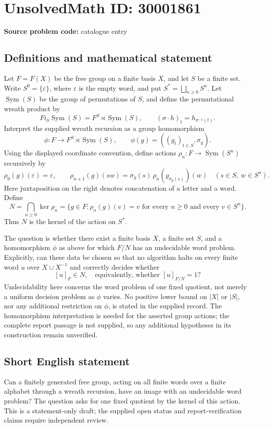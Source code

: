 \documentclass[11pt]{article}
\begin{document}
\section*{UnsolvedMath ID: 30001861}
\textbf{Source problem code:} catalogue entry
\subsection{Definitions and mathematical statement}
Let \(F=F(X)\) be the free group on a finite basis \(X\), and let \(S\) be a finite set. Write \(S^0=\{\varepsilon\}\), where \(\varepsilon\) is the empty word, and put \(S^*=\bigsqcup_{n\geq 0}S^n\). Let \(\operatorname{Sym}(S)\) be the group of permutations of \(S\), and define the permutational wreath product by
\[
F\wr_S\operatorname{Sym}(S)=F^S\rtimes\operatorname{Sym}(S),
\qquad (\sigma\cdot h)_t=h_{\sigma^{-1}(t)}.
\]
Interpret the supplied wreath recursion as a group homomorphism
\[
\phi:F\longrightarrow F^S\rtimes\operatorname{Sym}(S),
\qquad \phi(g)=((g_t)_{t\in S},\sigma_g).
\]
Using the displayed coordinate convention, define actions \(\rho_n:F\to\operatorname{Sym}(S^n)\) recursively by
\[
\rho_0(g)(\varepsilon)=\varepsilon,
\qquad
\rho_{n+1}(g)(sw)=\sigma_g(s)\,\rho_n(g_{\sigma_g(s)})(w)
\quad(s\in S,\ w\in S^n).
\]
Here juxtaposition on the right denotes concatenation of a letter and a word. Define
\[
N=\bigcap_{n\geq0}\ker\rho_n
 =\{g\in F:\rho_n(g)(v)=v\text{ for every }n\geq0\text{ and every }v\in S^n\}.
\]
Thus \(N\) is the kernel of the action on \(S^*\).

The question is whether there exist a finite basis \(X\), a finite set \(S\), and a homomorphism \(\phi\) as above for which \(F/N\) has an undecidable word problem. Explicitly, can these data be chosen so that no algorithm halts on every finite word \(u\) over \(X\cup X^{-1}\) and correctly decides whether
\[
[u]_F\in N,
\quad\text{equivalently, whether }[u]_{F/N}=1?
\]
Undecidability here concerns the word problem of one fixed quotient, not merely a uniform decision problem as \(\phi\) varies. No positive lower bound on \(|X|\) or \(|S|\), nor any additional restriction on \(\phi\), is stated in the supplied record. The homomorphism interpretation is needed for the asserted group actions; the complete report passage is not supplied, so any additional hypotheses in its construction remain unverified.
\subsection{Short English statement}
Can a finitely generated free group, acting on all finite words over a finite alphabet through a wreath recursion, have an image with an undecidable word problem? The question asks for one fixed quotient by the kernel of this action. This is a statement-only draft; the supplied open status and report-verification claims require independent review.
\end{document}

